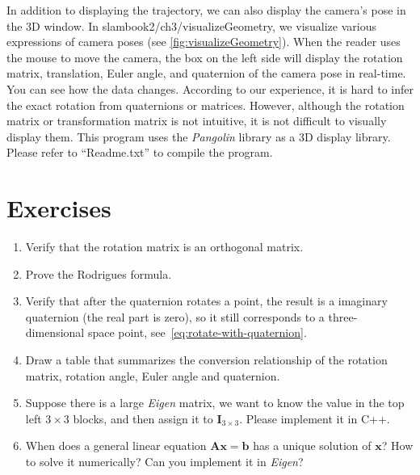 In addition to displaying the trajectory, we can also display the camera's pose in the 3D window. In slambook2/ch3/visualizeGeometry, we visualize various expressions of camera poses (see \autoref{fig:visualizeGeometry}). When the reader uses the mouse to move the camera, the box on the left side will display the rotation matrix, translation, Euler angle, and quaternion of the camera pose in real-time. You can see how the data changes. According to our experience, it is hard to infer the exact rotation from quaternions or matrices. However, although the rotation matrix or transformation matrix is not intuitive, it is not difficult to visually display them. This program uses the \textit{Pangolin} library as a 3D display library. Please refer to ``Readme.txt'' to compile the program.

\section*{Exercises}
\begin{enumerate}
	\item Verify that the rotation matrix is an orthogonal matrix.
	\item Prove the Rodrigues formula.
	\item Verify that after the quaternion rotates a point, the result is a imaginary quaternion (the real part is zero), so it still corresponds to a three-dimensional space point, see~\eqref{eq:rotate-with-quaternion}.
	\item Draw a table that summarizes the conversion relationship of the rotation matrix, rotation angle, Euler angle and quaternion.
	\item Suppose there is a large \textit{Eigen} matrix, we want to know the value in the top left $3 \times 3$ blocks, and then assign it to $\mathbf{I}_{3 \times 3}$. Please implement it in C++.
	\item When does a general linear equation $\mathbf{A} \mathbf{x}=\mathbf{b}$ has a unique solution of $\mathbf{x}$? How to solve it numerically? Can you implement it in \textit{Eigen}?
\end{enumerate}

